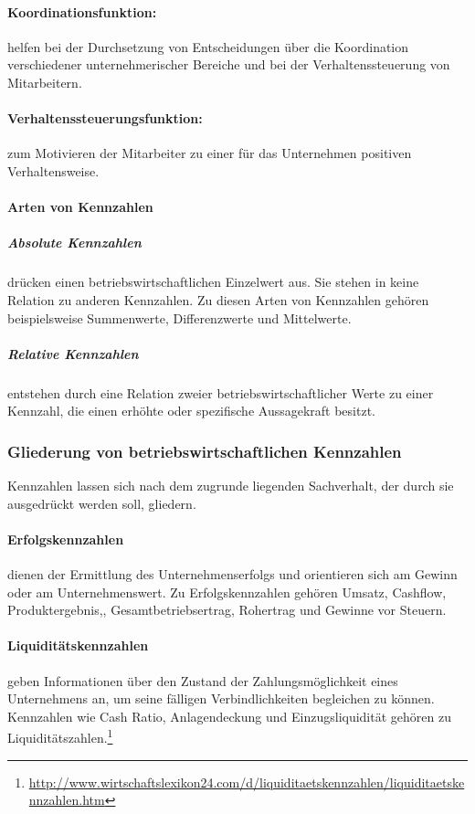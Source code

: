 \paragraph{Koordinationsfunktion:} helfen bei der Durchsetzung von Entscheidungen über die Koordination verschiedener unternehmerischer Bereiche und bei der Verhaltenssteuerung von Mitarbeitern.
\paragraph{Verhaltenssteuerungsfunktion:} zum Motivieren der Mitarbeiter zu einer für das Unternehmen positiven Verhaltensweise.

\newpage

\paragraph{Arten von Kennzahlen}
\subparagraph{Absolute Kennzahlen} drücken einen betriebswirtschaftlichen Einzelwert aus. Sie stehen in keine Relation zu anderen Kennzahlen. Zu diesen Arten von Kennzahlen gehören beispielsweise Summenwerte, Differenzwerte und Mittelwerte.
\subparagraph{Relative Kennzahlen} entstehen durch eine Relation zweier betriebswirtschaftlicher Werte zu einer Kennzahl, die einen erhöhte oder spezifische Aussagekraft besitzt.

\subsubsection{Gliederung von betriebswirtschaftlichen Kennzahlen}
Kennzahlen lassen sich nach dem zugrunde liegenden Sachverhalt, der durch sie ausgedrückt werden soll, gliedern.

\paragraph{Erfolgskennzahlen} dienen der Ermittlung des Unternehmenserfolgs und orientieren sich am Gewinn oder am Unternehmenswert. Zu Erfolgskennzahlen gehören Umsatz, Cashflow, Produktergebnis,, Gesamtbetriebsertrag, Rohertrag und Gewinne vor Steuern.

\paragraph{Liquiditätskennzahlen} geben Informationen über den Zustand der Zahlungsmöglichkeit eines Unternehmens an, um seine fälligen Verbindlichkeiten begleichen zu können. Kennzahlen wie Cash Ratio, Anlagendeckung und Einzugsliquidität gehören zu Liquiditätszahlen.\footnote{\url{http://www.wirtschaftslexikon24.com/d/liquiditaetskennzahlen/liquiditaetskennzahlen.htm}}


